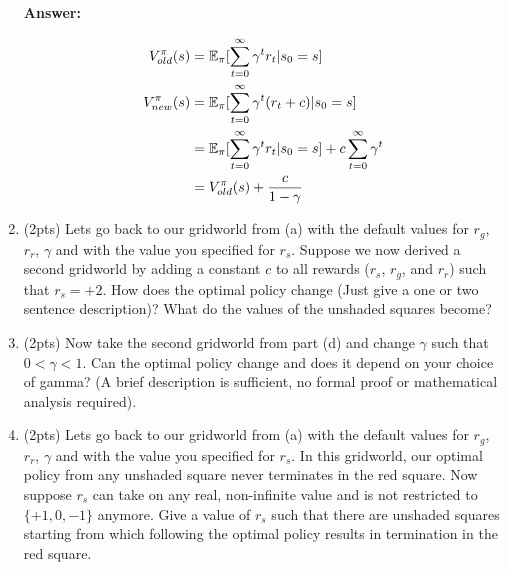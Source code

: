 \begin{enumerate}[label=(\alph*)]
\textbf{Answer:}

\begin{equation}
\begin{split}
V^\pi_{old}(s) & = \mathbb E_{\pi}[\sum_{t=0}^{\infty} \gamma^{t}r_t|s_0=s] \\
V^\pi_{new}(s) & = \mathbb E_{\pi}[\sum_{t=0}^{\infty}\gamma^{t}(r_t + c)|s_0=s] \\
               & = \mathbb E_{\pi}[\sum_{t=0}^{\infty}\gamma^{t}r_t|s_0=s] + c\sum_{t=0}^{\infty}\gamma^{t} \\
               & = V^\pi_{old}(s) + \frac{c}{1-\gamma}
\end{split}
\end{equation}



\item (2pts) Lets go back to our gridworld from (a) with the default values for $r_g$, $r_r$, $\gamma$ and with the value you specified for $r_s$. Suppose we now derived a second gridworld by adding a constant $c$ to all rewards ($r_s$, $r_g$, and $r_r$) such that $r_s = +2$. How does the optimal policy change (Just give a one or two sentence description)? What do the values of the unshaded squares become?

\item (2pts) Now take the second gridworld from part (d) and change $\gamma$ such that $0 < \gamma < 1$. Can the optimal policy change and does it depend on your choice of gamma? (A brief description is sufficient, no formal proof or mathematical analysis required).

\item (2pts) Lets go back to our gridworld from (a) with the default values for $r_g$, $r_r$, $\gamma$ and with the value you specified for $r_s$. In this gridworld, our optimal policy from any unshaded square never terminates in the red square. Now suppose $r_s$ can take on any real, non-infinite value and is not restricted to $\{+1, 0, -1\}$ anymore. Give a value of $r_s$ such that there are unshaded squares starting from which following the optimal policy results in termination in the red square.


\end{enumerate}
